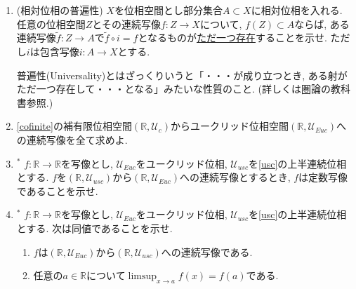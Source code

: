 \documentclass[dvipdfmx,a4paper,11pt]{article}
\newcommand{\R}{\mathbb{R}}
\theoremstyle{definition}
\begin{document}
\begin{enumerate}[ label=\textbf{問}\ref*{sec-conti}.\arabic*]

\item (相対位相の普遍性) $X$を位相空間とし部分集合$A\subset X$に相対位相を入れる. 
任意の位相空間$Z$とその連続写像$f : Z \to X$について, $f(Z) \subset A$ならば, ある連続写像$\widetilde{f} : Z \to A$で$\widetilde{f} \circ i = f$となるものが\underline{ただ一つ存在}することを示せ. ただし$i$は包含写像$i: A \to X$とする. 

   \begin{tcolorbox}[
    colback = white,
    colframe = green!35!black,
    fonttitle = \bfseries,
    breakable = true]
普遍性(Universality)とはざっくりいうと「・・・が成り立つとき, ある射がただ一つ存在して・・・となる」みたいな性質のこと. 
(詳しくは圏論の教科書参照.)
 \end{tcolorbox}
 

\item \ref{cofinite}の補有限位相空間$(\R, \mathscr{U}_c)$からユークリッド位相空間$(\R, \mathscr{U}_{Euc})$への連続写像を全て求めよ.

\item $^*$ $f : \R \rightarrow \R$を写像とし, $\mathscr{U}_{Euc}$をユークリッド位相, $\mathscr{U}_{usc}$を\ref{usc}の上半連続位相とする. $f$を$(\R, \mathscr{U}_{usc})$から$(\R, \mathscr{U}_{Euc})$への連続写像とするとき, $f$は定数写像であることを示せ.

\item $^*$ $f : \R \rightarrow \R$を写像とし, $\mathscr{U}_{Euc}$をユークリッド位相, $\mathscr{U}_{usc}$を\ref{usc}の上半連続位相とする. 次は同値であることを示せ.
	\begin{enumerate}
	\setlength{\parskip}{0cm} 
  \setlength{\itemsep}{0cm} 
	\item $f$は$(\R, \mathscr{U}_{Euc})$から$(\R, \mathscr{U}_{usc})$への連続写像である.
	\item 任意の$a \in \R$について$\limsup_{x \rightarrow a} f(x) =f(a)$である.
	\end{enumerate}





\end{enumerate}
\end{document}

